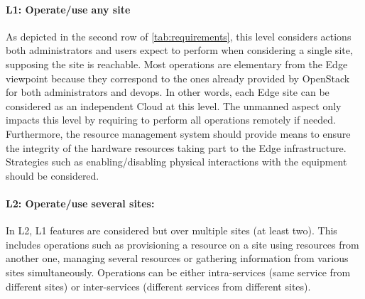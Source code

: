 \paragraph{L1: Operate/use any site}
As depicted in the second row of \cref{tab:requirements}, this level
considers actions both administrators and users expect to perform
when considering a single site, supposing the site is reachable.
%
Most operations are elementary from the Edge viewpoint because they correspond
to the ones already provided by OpenStack for both administrators and devops.
In other words, each Edge site can be considered as an independent Cloud at
this level. The unmanned aspect only impacts this level by requiring to perform
all operations remotely if needed.
Furthermore, the resource management system should provide means to
ensure the integrity of the hardware resources taking part to the Edge
infrastructure. Strategies such as enabling/disabling physical
interactions with the equipment should be considered.




\paragraph{L2: Operate/use several sites:}

In L2, L1 features are considered but over multiple sites (at least two). This
includes operations such as provisioning a resource on a site using resources
from another one, managing several resources or gathering information from
various sites simultaneously.
Operations can be either intra-services (same service from different sites) or
inter-services (different services from different sites).

